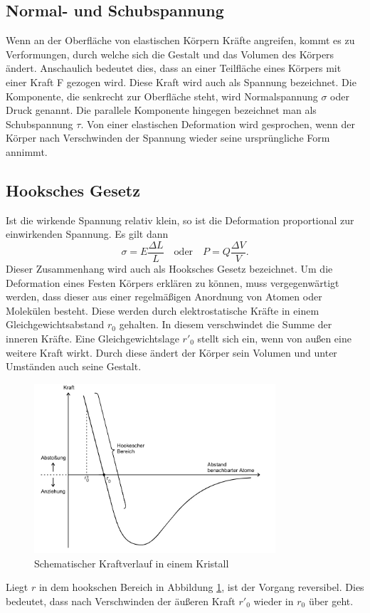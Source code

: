 \subsection{Normal- und Schubspannung}
Wenn an der Oberfläche von elastischen Körpern Kräfte angreifen, kommt es zu
Verformungen, durch welche sich die Gestalt und das Volumen des Körpers ändert.
Anschaulich bedeutet dies, dass an einer Teilfläche eines Körpers mit einer
Kraft F gezogen wird. Diese Kraft wird auch als Spannung bezeichnet. Die
Komponente, die senkrecht zur Oberfläche steht, wird Normalspannung $\sigma$ oder
Druck genannt. Die parallele Komponente hingegen bezeichnet man als
Schubspannung $\tau$.
Von einer elastischen Deformation wird gesprochen, wenn der Körper nach
Verschwinden der Spannung wieder seine ursprüngliche Form annimmt.
\subsection{Hooksches Gesetz}
Ist die wirkende Spannung relativ klein, so ist die Deformation proportional
zur einwirkenden Spannung. Es gilt dann
\begin{equation}
  \sigma = E\frac{\Delta L}{L}\quad\text{oder}\quad P=Q\frac{\Delta V}{V}.
  \label{eq:hook}
\end{equation}
Dieser Zusammenhang wird auch als Hooksches Gesetz bezeichnet. Um die
Deformation eines Festen Körpers erklären zu können, muss vergegenwärtigt werden,
 dass dieser aus einer regelmäßigen Anordnung von Atomen oder Molekülen
besteht. Diese werden durch elektrostatische Kräfte in einem
Gleichgewichtsabstand $r_0$ gehalten. In diesem verschwindet die Summe der
inneren Kräfte. Eine Gleichgewichtslage $r'_0$ stellt sich ein, wenn von außen
eine weitere Kraft wirkt. Durch diese ändert der Körper sein Volumen und unter
Umständen auch seine Gestalt.
\begin{figure}[H]
  \centering
  \includegraphics[width=0.8\textwidth]{bilder/kraftverlauf.jpg}
  \caption{Schematischer Kraftverlauf in einem Kristall\cite{102}}
  \label{kraft}
\end{figure}
Liegt $r$ in dem hookschen Bereich in Abbildung \ref{kraft}, ist der Vorgang
reversibel. Dies bedeutet, dass nach Verschwinden der äußeren Kraft $r'_0$
wieder in $r_0$ über geht.


